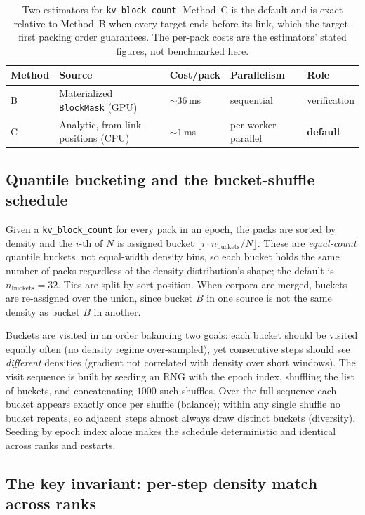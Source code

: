 \begin{table}[t]
\centering
\small
\begin{tabular}{lllll}
\toprule
Method & Source & Cost/pack & Parallelism & Role \\
\midrule
B & Materialized \texttt{BlockMask} (GPU) & $\sim 36$\,ms & sequential & verification \\
C & Analytic, from link positions (CPU) & $\sim 1$\,ms & per-worker parallel & \textbf{default} \\
\bottomrule
\end{tabular}
\caption{Two estimators for \texttt{kv\_block\_count}. Method~C is the default and
is exact relative to Method~B when every target ends before its link, which the
target-first packing order guarantees. The per-pack costs are the estimators'
stated figures, not benchmarked here.}
\label{tab:density-methods}
\end{table}

\subsection{Quantile bucketing and the bucket-shuffle schedule}

Given a \texttt{kv\_block\_count} for every pack in an epoch, the packs are sorted
by density and the $i$-th of $N$ is assigned bucket
$\lfloor i \cdot n_\text{buckets} / N \rfloor$. These are \emph{equal-count}
quantile buckets, not equal-width density bins, so each bucket holds the same
number of packs regardless of the density distribution's shape; the default is
$n_\text{buckets}=32$. Ties are split by sort position. When corpora are merged,
buckets are re-assigned over the union, since bucket $B$ in one source is not the
same density as bucket $B$ in another.

Buckets are visited in an order balancing two goals: each bucket should be
visited equally often (no density regime over-sampled), yet consecutive steps
should see \emph{different} densities (gradient not correlated with density over
short windows). The visit sequence is built by seeding an RNG with the epoch
index, shuffling the list of buckets, and concatenating $1000$ such shuffles.
Over the full sequence each bucket appears exactly once per shuffle (balance);
within any single shuffle no bucket repeats, so adjacent steps almost always draw
distinct buckets (diversity). Seeding by epoch index alone makes the schedule
deterministic and identical across ranks and restarts.

\subsection{The key invariant: per-step density match across ranks}

